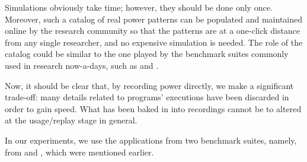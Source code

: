 Simulations obviously take time; however, they should be done only once.
Moreover, such a catalog of real power patterns can be populated and maintained
online by the research community so that the patterns are at a one-click
distance from any single researcher, and no expensive simulation is needed. The
role of the catalog could be similar to the one played by the benchmark suites
commonly used in research now-a-days, such as  \cite{bienia2011} and
 \cite{cpu2006}.

Now, it should be clear that, by recording power directly, we make a significant
trade-off: many details related to programs' executions have been discarded in
order to gain speed. What has been baked in into recordings cannot be to altered
at the usage/replay stage in general.

In our experiments, we use the applications from two benchmark suites, namely,
from  and , which were mentioned earlier.
